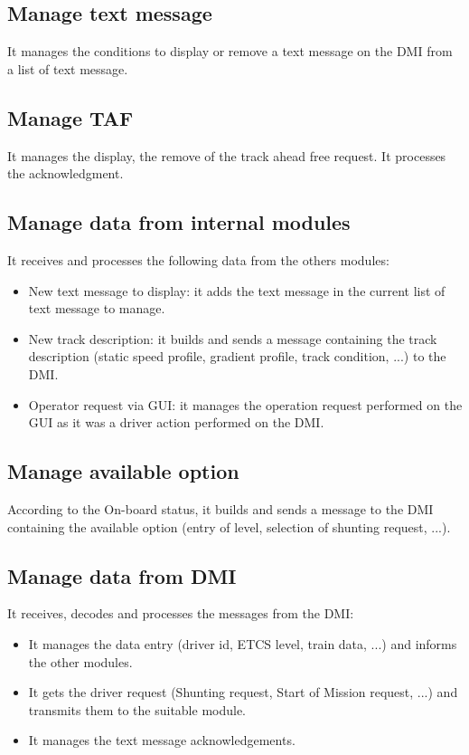 \documentclass[nocc]{template/openetcs_report}
\begin{document}
\subsection{Manage text message}
It manages the conditions to display or remove a text message on the DMI from a list of text message.
\subsection{Manage TAF}
It manages the display, the remove of the track ahead free request. It processes the acknowledgment.

\subsection{Manage data from internal modules}
It receives and processes the following data from the others modules:
\begin{itemize}
\item New text message to display: it adds the text message in the current list of text message to manage.
\item New track description: it builds and sends a message containing the track description (static speed profile, gradient profile, track condition, ...) to the DMI.
\item Operator request via GUI: it manages the operation request performed on the GUI as it was a driver action performed on the DMI.
\end{itemize}

\subsection{Manage available option}
According to the On-board status, it builds and sends a message to the DMI containing the available option (entry of level, selection of shunting request, ...).

\subsection{Manage data from DMI}
It receives, decodes and processes the messages from the DMI:
\begin{itemize}
\item It manages the data entry (driver id, ETCS level, train data, ...) and informs the other modules.
\item It gets the driver request (Shunting request, Start of Mission request, ...) and transmits them to the suitable module.
\item It manages the text message acknowledgements.
\end{itemize}
\end{document}
